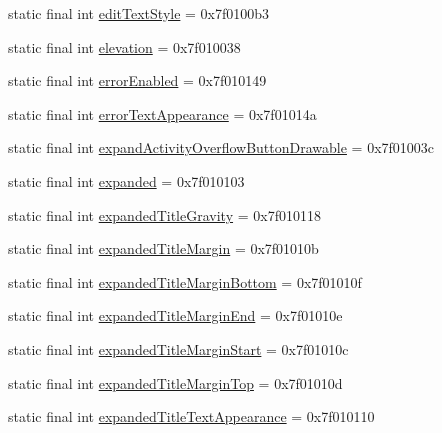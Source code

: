 \begin{CompactItemize}
\item 
static final int \hyperlink{classandroid_1_1support_1_1graphics_1_1drawable_1_1_r_1_1attr_c616fbcbebf5d253669d1fd6a750ef3d}{editTextStyle} = 0x7f0100b3
\item 
static final int \hyperlink{classandroid_1_1support_1_1graphics_1_1drawable_1_1_r_1_1attr_e63fd488091d33917135ee0aa13f7313}{elevation} = 0x7f010038
\item 
static final int \hyperlink{classandroid_1_1support_1_1graphics_1_1drawable_1_1_r_1_1attr_733c2aedeb0b2e2620599960236df80b}{errorEnabled} = 0x7f010149
\item 
static final int \hyperlink{classandroid_1_1support_1_1graphics_1_1drawable_1_1_r_1_1attr_3a203591267c808e75a0ec2093c01dd6}{errorTextAppearance} = 0x7f01014a
\item 
static final int \hyperlink{classandroid_1_1support_1_1graphics_1_1drawable_1_1_r_1_1attr_f86125efbf72db5618c9f8ab4bd91b54}{expandActivityOverflowButtonDrawable} = 0x7f01003c
\item 
static final int \hyperlink{classandroid_1_1support_1_1graphics_1_1drawable_1_1_r_1_1attr_fb42b2f7fb4883dee9cd839dba1b0bf5}{expanded} = 0x7f010103
\item 
static final int \hyperlink{classandroid_1_1support_1_1graphics_1_1drawable_1_1_r_1_1attr_39e6f01ff2b762cd0f40b80ca11648f5}{expandedTitleGravity} = 0x7f010118
\item 
static final int \hyperlink{classandroid_1_1support_1_1graphics_1_1drawable_1_1_r_1_1attr_96b88d248c834a6c6a2f377079b5ecee}{expandedTitleMargin} = 0x7f01010b
\item 
static final int \hyperlink{classandroid_1_1support_1_1graphics_1_1drawable_1_1_r_1_1attr_a7e811a054ff0f14f5ff88485570c4f4}{expandedTitleMarginBottom} = 0x7f01010f
\item 
static final int \hyperlink{classandroid_1_1support_1_1graphics_1_1drawable_1_1_r_1_1attr_c7bac2748754438543f42292399d9271}{expandedTitleMarginEnd} = 0x7f01010e
\item 
static final int \hyperlink{classandroid_1_1support_1_1graphics_1_1drawable_1_1_r_1_1attr_60dfc33179b494fa82f9daa590771ff7}{expandedTitleMarginStart} = 0x7f01010c
\item 
static final int \hyperlink{classandroid_1_1support_1_1graphics_1_1drawable_1_1_r_1_1attr_7bab5b962fbe3800e4eec67d02a09bb8}{expandedTitleMarginTop} = 0x7f01010d
\item 
static final int \hyperlink{classandroid_1_1support_1_1graphics_1_1drawable_1_1_r_1_1attr_8f6fd59f37bb6f11a5124c79cdb5038f}{expandedTitleTextAppearance} = 0x7f010110

\end{CompactItemize}
